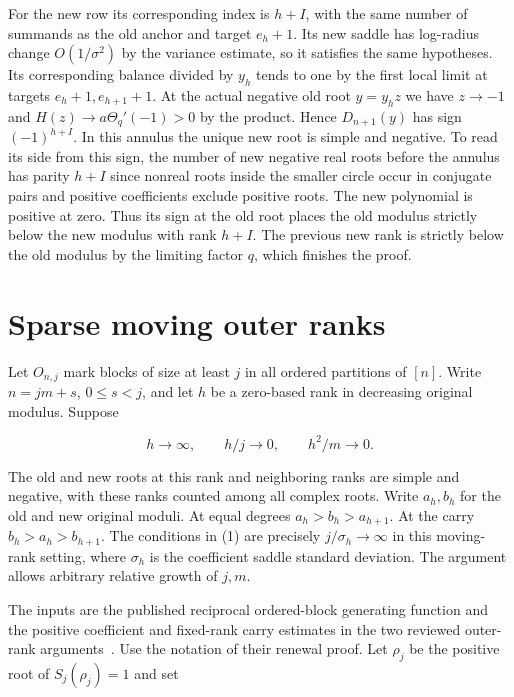 \documentclass[11pt]{article}
\begin{document}
For the new row its corresponding index is \(h+I\), with the same number of summands as the old anchor and target \(e_h+1\). Its new saddle has log-radius change \(O(1/\sigma^2)\) by the variance estimate, so it satisfies the same hypotheses. Its corresponding balance divided by \(y_h\) tends to one by the first local limit at targets \(e_h+1,e_{h+1}+1\). At the actual negative old root \(y=y_h z\) we have \(z\to-1\) and \(H(z)\to a\Theta_q'(-1)>0\) by the product. Hence \(D_{n+1}(y)\) has sign \((-1)^{h+I}\). In this annulus the unique new root is simple and negative. To read its side from this sign, the number of new negative real roots before the annulus has parity \(h+I\) since nonreal roots inside the smaller circle occur in conjugate pairs and positive coefficients exclude positive roots. The new polynomial is positive at zero. Thus its sign at the old root places the old modulus strictly below the new modulus with rank \(h+I\). The previous new rank is strictly below the old modulus by the limiting factor \(q\), which finishes the proof.

\section{Sparse moving outer ranks}
\label{sec:sparse}

Let \(O_{n,j}\) mark blocks of size at least \(j\) in all ordered partitions of \([n]\). Write \(n=jm+s\), \(0\le s<j\), and let \(h\) be a zero-based rank in decreasing original modulus. Suppose

\begin{equation*}
h\to\infty,\qquad h/j\to0,\qquad h^2/m\to0.
 \tag{1}
\end{equation*}

The old and new roots at this rank and neighboring ranks are simple and negative, with these ranks counted among all complex roots. Write \(a_h,b_h\) for the old and new original moduli. At equal degrees \(a_h>b_h>a_{h+1}\). At the carry \(b_h>a_h>b_{h+1}\). The conditions in (1) are precisely \(j/\sigma_h\to\infty\) in this moving-rank setting, where \(\sigma_h\) is the coefficient saddle standard deviation. The argument allows arbitrary relative growth of \(j,m\).

The inputs are the published reciprocal ordered-block generating function and the positive coefficient and fixed-rank carry estimates in the two reviewed outer-rank arguments~\cite{outer}. Use the notation of their renewal proof. Let \(\rho_j\) be the positive root of \(S_j(\rho_j)=1\) and set
\end{document}
